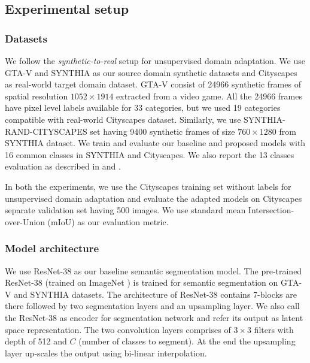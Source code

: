 \documentclass[10pt,twocolumn,letterpaper]{article}
\begin{document}
\subsection{Experimental setup}
\subsubsection{Datasets}
We follow the \textit{synthetic-to-real} setup for unsupervised domain adaptation. We use GTA-V \cite{Richter_2016_ECCV} and SYNTHIA \cite{Ros_2016_CVPR} as our source domain synthetic datasets and Cityscapes \cite{Cordts2016Cityscapes} as real-world target domain dataset. 
GTA-V consist of 24966 synthetic frames of spatial resolution $1052 \times 1914$ extracted from a video game. All the 24966 frames have pixel level labels available for 33 categories, but we used 19 categories compatible with real-world Cityscapes dataset. 
Similarly, we use SYNTHIA-RAND-CITYSCAPES set having 9400 synthetic frames of size $760 \times 1280$ from SYNTHIA dataset. We train and evaluate our baseline and proposed models with 16 common classes in SYNTHIA and Cityscapes. We also report the 13 classes evaluation as described in \cite{vu2019advent} and \cite{zou2018unsupervised}.

In both the experiments, we use the Cityscapes training set without labels for unsupervised domain adaptation and evaluate the adapted models on Cityscapes separate validation set having 500 images. We use standard mean Intersection-over-Union (mIoU) as our evaluation metric.
\vspace{-0.2cm}
\subsubsection{Model architecture}
\vspace{-0.1cm}

We use ResNet-38 \cite{wu2019Resnet38} as our baseline semantic segmentation model. The pre-trained ResNet-38 (trained on ImageNet \cite{russakovsky2015imagenet}) is trained for semantic segmentation on GTA-V and SYNTHIA datasets. 
The architecture of ResNet-38 contains 7-blocks are there followed by two segmentation layers and an upsampling layer. We also call the ResNet-38 as encoder for segmentation network and refer its output as latent space representation. The two convolution layers comprises of $3 \times 3$ filters with depth of 512 and $C$ (number of classes to segment). At the end the upsampling layer up-scales the output using bi-linear interpolation. 
\end{document}
